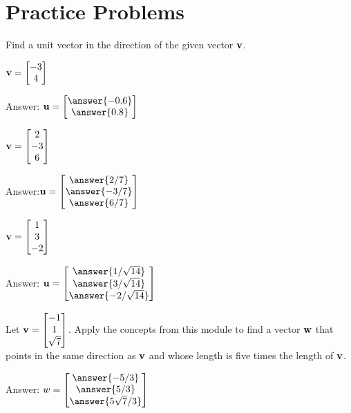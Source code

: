 \documentclass{ximera}
\begin{document}
\section*{Practice Problems}
\begin{problem}
    Find a unit vector in the direction of the given vector ${\bf v}$.
  \begin{problem}
  ${\bf v}=\begin{bmatrix}-3\\4\end{bmatrix}$

  Answer: $\vec{u}=\begin{bmatrix}\answer{-0.6}\\\answer{0.8}\end{bmatrix}$
  \end{problem}
  \begin{problem}
      ${\bf v}=\begin{bmatrix}2\\-3\\6\end{bmatrix}$

Answer:$\vec{u}=\begin{bmatrix}\answer{2/7}\\\answer{-3/7}\\\answer{6/7}\end{bmatrix}$
   \end{problem}
   \begin{problem}
        ${\bf v}=\begin{bmatrix}1\\3\\-2\end{bmatrix}$

 Answer: $\vec{u}=\begin{bmatrix}\answer{1/\sqrt{14}}\\\answer{3/\sqrt{14}}\\\answer{-2/\sqrt{14}}\end{bmatrix}$       
  \end{problem}
\end{problem}  
\begin{problem}
Let ${\bf v}=\begin{bmatrix}-1\\1\\\sqrt{7}\end{bmatrix}$.
Apply the concepts from this module to find a vector ${\bf w}$ that points in the same direction as ${\bf v}$ and whose length is five times the length of ${\bf v}$.

Answer: $w=\begin{bmatrix}
    \answer{-5/3}\\\answer{5/3}\\\answer{5\sqrt{7}/3}
\end{bmatrix}$
\end{problem}
\end{document}
